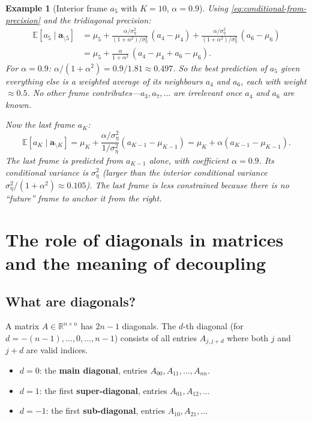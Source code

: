 \documentclass[11pt,a4paper]{article}
\newtheorem{example}[theorem]{Example}
\newcommand{\R}{\mathbb{R}}
\newcommand{\E}{\mathbb{E}}
\newcommand{\sigeta}{\sigma_\eta^2}
\begin{document}
\begin{example}[Interior frame $a_5$ with $K = 10$, $\alpha = 0.9$]
Using \eqref{eq:conditional-from-precision} and the tridiagonal precision:
\begin{align}
  \E[a_5 \mid \mathbf{a}_{\setminus 5}] &= \mu_5 + \frac{\alpha/\sigeta}{(1+\alpha^2)/\sigeta}\,(a_4 - \mu_4) + \frac{\alpha/\sigeta}{(1+\alpha^2)/\sigeta}\,(a_6 - \mu_6) \\
  &= \mu_5 + \frac{\alpha}{1+\alpha^2}\,(a_4 - \mu_4 + a_6 - \mu_6).
\end{align}
For $\alpha = 0.9$: $\alpha/(1+\alpha^2) = 0.9/1.81 \approx 0.497$.  So the best prediction of $a_5$ given everything else is a weighted average of its neighbours $a_4$ and $a_6$, each with weight $\approx 0.5$.  No other frame contributes---$a_3, a_7, \dots$ are irrelevant once $a_4$ and $a_6$ are known.

Now the last frame $a_K$:
\begin{equation}
  \E[a_K \mid \mathbf{a}_{\setminus K}] = \mu_K + \frac{\alpha/\sigeta}{1/\sigeta}(a_{K-1} - \mu_{K-1}) = \mu_K + \alpha(a_{K-1} - \mu_{K-1}).
\end{equation}
The last frame is predicted from $a_{K-1}$ alone, with coefficient $\alpha = 0.9$.  Its conditional variance is $\sigeta$ (larger than the interior conditional variance $\sigeta/(1+\alpha^2) \approx 0.105$).  The last frame is \emph{less constrained} because there is no ``future'' frame to anchor it from the right.
\end{example}


\section{The role of diagonals in matrices and the meaning of decoupling}
\label{sec:q7}

\subsection{What are diagonals?}

A matrix $A \in \R^{n \times n}$ has $2n - 1$ diagonals.  The $d$-th diagonal (for $d = -(n-1), \dots, 0, \dots, n-1$) consists of all entries $A_{j,j+d}$ where both $j$ and $j+d$ are valid indices.
\begin{itemize}[nosep]
  \item $d = 0$: the \textbf{main diagonal}, entries $A_{00}, A_{11}, \dots, A_{nn}$.
  \item $d = 1$: the first \textbf{super-diagonal}, entries $A_{01}, A_{12}, \dots$
  \item $d = -1$: the first \textbf{sub-diagonal}, entries $A_{10}, A_{21}, \dots$
\end{itemize}
\end{document}
